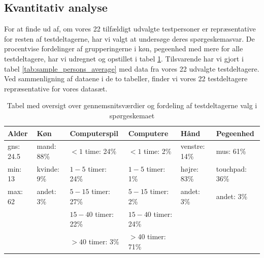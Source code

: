 \subsection*{Kvantitativ analyse}
For at finde ud af, om vores 22 tilfældigt udvalgte testpersoner er repræsentative for resten af testdeltagerne, har vi valgt at undersøge deres spørgeskemasvar. De procentvise fordelinger af grupperingerne i køn, pegeenhed med mere for alle testdeltagere, har vi udregnet og opstillet i tabel \ref{tab:persons_average}. Tilsvarende har vi gjort i tabel \ref{tab:sample_persons_average} med data fra vores 22 udvalgte testdeltagere. Ved sammenligning af dataene i de to tabeller, finder vi vores 22 testdeltagere repræsentative for vores datasæt.

\begin{table}[h]
	\centering
	\begin{tabular}{llllll}
		Alder           & Køn               & Computerspil              & Computere                 & Hånd                & Pegeenhed            \\\hline
		gns: \hfill24.5 & mand: \hfill88\%  & $<1$ time: \hfill24\%     & $<1$ time: \hfill2\%      & venstre: \hfill14\% & mus: \hfill61\%      \\
		min: \hfill13   & kvinde: \hfill9\% & $1-5$ timer: \hfill24\%   & $1-5$ timer: \hfill1\%    & højre: \hfill83\%   & touchpad: \hfill36\% \\
		max: \hfill62   & andet: \hfill3\%  & $5-15$ timer: \hfill27\%  & $5-15$ timer: \hfill2\%   & andet: \hfill3\%    & andet: \hfill3\%     \\
		                &                   & $15-40$ timer: \hfill22\% & $15-40$ timer: \hfill24\% &                     &\\
		                &                   & $>40$ timer: \hfill3\%    & $>40$ timer: \hfill71\%   &                     &
	\end{tabular}
	\caption{Tabel med oversigt over gennemsnitsværdier og fordeling af testdeltagerne valg i spørgeskemaet}
	\label{tab:persons_average}
\end{table}

